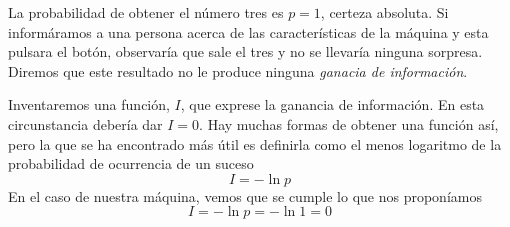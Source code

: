 La probabilidad de obtener el número tres es $p=1$, certeza absoluta.
Si informáramos a una persona acerca de las características de la máquina
y esta pulsara el botón, observaría que sale el tres y no se llevaría
ninguna sorpresa. Diremos que este resultado no le produce ninguna
\emph{ganacia de información}.


Inventaremos una función, $I$, que exprese la ganancia de información.
En esta circunstancia debería dar $I=0$. Hay muchas formas de obtener una
función así, pero la que se ha encontrado más útil es definirla como el menos
logaritmo de la probabilidad de ocurrencia de un suceso
\begin{equation}
  I = -\ln p
\end{equation}
En el caso de nuestra máquina, vemos que se cumple lo que nos proponíamos
\[
  I = -\ln p = -\ln 1 = 0
\]

